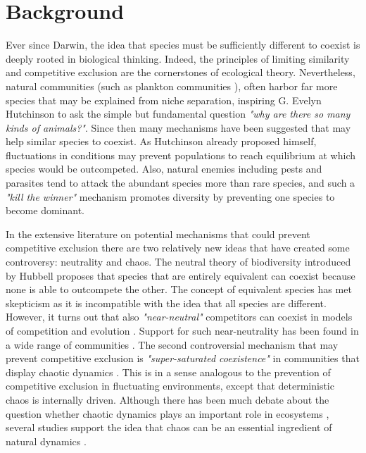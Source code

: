 \section{Background}
\label{sec:Background}
Ever since Darwin, the idea that species must be sufficiently different to coexist is deeply rooted in biological thinking. Indeed, the principles of limiting similarity \citep{MacArthur} and competitive exclusion \citep{Hardin1960, Armstrong1980} are the cornerstones of ecological theory. Nevertheless, natural communities (such as plankton communities \citep{Hutchinson1961}), often harbor far more species that may be explained from niche separation, inspiring G. Evelyn Hutchinson \citeyearpar{Hutchinson} to ask the simple but fundamental question \textit{"why are there so many kinds of animals?"}. Since then many mechanisms have been suggested that may help similar species to coexist. As Hutchinson \citeyearpar{Hutchinson1961} already proposed himself, fluctuations in conditions may prevent populations to reach equilibrium at which species would be outcompeted. Also, natural enemies including pests and parasites tend to attack the abundant species more than rare species, and such a \textit{"kill the winner"} \citep{Winter2010} mechanism promotes diversity by preventing one species to become dominant.

In the extensive literature on potential mechanisms that could prevent competitive exclusion there are two relatively new ideas that have created some controversy: neutrality and chaos. The neutral theory of biodiversity introduced by Hubbell \citeyearpar{Hubbell2001} proposes that species that are entirely equivalent can coexist because none is able to outcompete the other. The concept of equivalent species has met skepticism as it is incompatible with the idea that all species are different. However, it turns out that also \textit{"near-neutral"} competitors can coexist in models of competition and evolution \citep{Scheffer2006, Scheffer2018}. Support for such near-neutrality has been found in a wide range of communities \citep{Vergnon2013, Segura2013}. The second controversial mechanism that may prevent competitive exclusion is \textit{"super-saturated coexistence"} in communities that display chaotic dynamics \citep{Huisman1999}. This is in a sense analogous to the prevention of competitive exclusion in fluctuating environments, except that deterministic chaos is internally driven. Although there has been much debate about the question whether chaotic dynamics plays an important role in ecosystems \citep{Berryman1989, Scheffer1991, Schippers2001}, several studies support the idea that chaos can be an essential ingredient of natural dynamics \citep{Huisman1999, Beninca2008, Beninca}.

